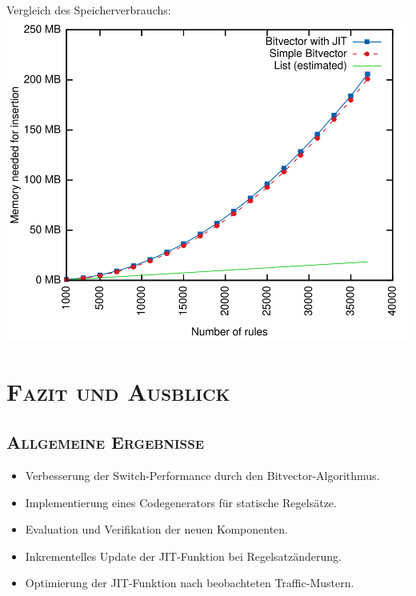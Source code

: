 \documentclass[xcolor=x11names,compress]{beamer}
\renewcommand{\(}{\begin{columns}}
\renewcommand{\)}{\end{columns}}
\newcommand{\<}[1]{\begin{column}{#1}}
\renewcommand{\>}{\end{column}}
\begin{document}
\begin{frame}
  Vergleich des Speicherverbrauchs:
  \includegraphics[height=0.9\textheight]{figures/eval_mem}
\end{frame}

\section{\scshape Fazit und Ausblick}
\begin{frame}
  \centering\Huge{\insertsection}
\end{frame}

\subsection{\scshape Allgemeine Ergebnisse}
\begin{frame}
  \begin{tcolorbox}[colback=teal!5!white,colframe=teal!75!black,title=Wichtigste Ergebnisse,drop fuzzy shadow]
    \begin{itemize}
      \item Verbesserung der Switch-Performance durch den Bitvector-Algorithmus.
      \item Implementierung eines Codegenerators für statische Regelsätze.
      \item Evaluation und Verifikation der neuen Komponenten.
    \end{itemize}
  \end{tcolorbox}
  \pause
  \begin{tcolorbox}[colback=blue!5!white,colframe=blue!75!black,title=Künftige Anknüpfungspunkte,drop fuzzy shadow]
    \begin{itemize}
      \item Inkrementelles Update der JIT-Funktion bei Regelsatzänderung.
      \item Optimierung der JIT-Funktion nach beobachteten Traffic-Mustern.
    \end{itemize}
  \end{tcolorbox}
\end{frame}
\end{document}
